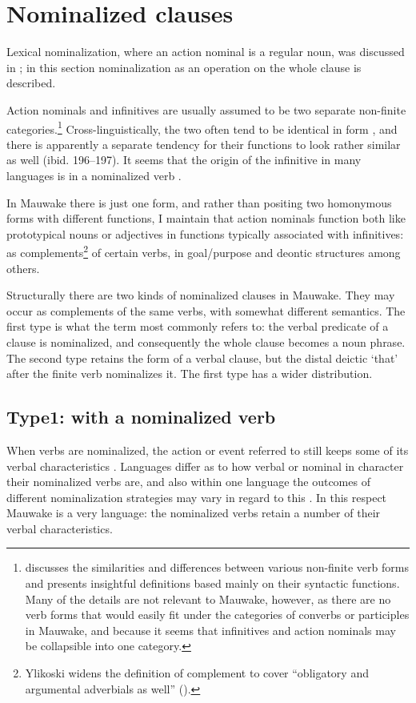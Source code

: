 \section{Nominalized clauses}
{}
Lexical nominalization, where an action nominal is a regular noun, was discussed in ; in this section nominalization as an operation on the whole clause is described.

Action nominals and infinitives are usually assumed to be two separate non-finite categories.\footnote{\citet{Ylikoski2003,Ylikoski2009} discusses the similarities and differences between various non-finite verb forms and presents insightful definitions based mainly on their syntactic functions. Many of the details are not relevant to Mauwake, however, as there are no verb forms that would easily fit under the categories of converbs or participles in Mauwake, and because it seems that infinitives and action nominals may be collapsible into one category.} Cross-linguistically, the two often tend to be identical in form \citep[224]{Ylikoski2003}, and there is apparently a separate tendency for their functions to look rather similar as well (ibid. 196--197). It seems that the origin of the infinitive in many languages is in a nominalized verb \citep[69]{Noonan2007}. 

In Mauwake there is just one form, and rather than positing two homonymous forms with different functions, I maintain that action nominals function both like prototypical nouns or adjectives  in functions typically associated with infinitives: as complements\footnote{Ylikoski widens the definition of complement to cover ``obligatory and argumental adverbials as well'' (\citeyear[209]{Ylikoski2003}).} of certain verbs, in goal/purpose and deontic structures among others.  

Structurally there are two kinds of nominalized clauses in Mauwake. They may occur as complements of the same verbs, with somewhat different semantics. The first type is what the term  most commonly refers to: the verbal predicate of a clause is nominalized, and consequently the whole clause becomes a noun phrase. The second type retains the form of a verbal clause, but the distal deictic  `that' after the finite verb nominalizes it.  The first type has a wider distribution.

\subsection{Type1: with a nominalized verb}
{}
When verbs are nominalized, the action or event referred to still keeps some of its verbal characteristics \citep[177]{HopperEtAl1985}. Languages differ as to how verbal or nominal in character their nominalized verbs are, and also within one language the outcomes of different nominalization strategies may vary in regard to this \citep[344]{ComrieEtAl2007}%
. In this respect Mauwake is a very  language: the nominalized verbs retain a number of their verbal characteristics.

